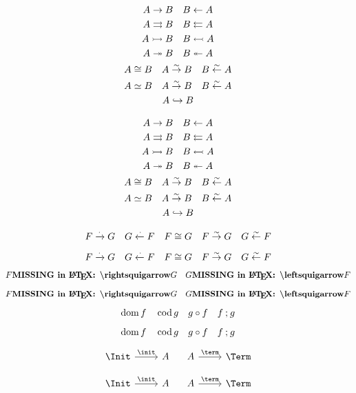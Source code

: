 \documentclass{article}
\begin{document}
\begin{verbatim*}
\begin{gather*}
A\to B\quad
B\from A\\
A\toto B\quad
B\fromfrom A\\
A\monoto B\quad
B\monofrom A\\
A\epito B\quad
B\epifrom A\\
A\iso B\quad
A\isoto B\quad
B\isofrom A\\
A\equ B\quad
A\equivto B\quad
B\equivfrom A\\
A\embeds B
\end{gather*}
\end{verbatim*}
%
\begin{gather*}
  A \to B \quad
  B \leftarrow A \\
  A \rightrightarrows B \quad
  B \leftleftarrows A \\
  A \rightarrowtail B \quad
  B \leftarrowtail A \\
  A \twoheadrightarrow B \quad
  B \twoheadleftarrow A \\
  A \cong B \quad
  A \stackrel{\sim}{\rightarrow} B \quad
  B \stackrel{\sim}{\leftarrow} A \\
  A \simeq B \quad
  A \stackrel{\sim}{\rightarrow} B \quad
  B \stackrel{\sim}{\leftarrow} A \\
  A \hookrightarrow B
\end{gather*}

\begin{verbatim*}
\[
F\natto G\quad
G\natfrom F\quad
F\natiso G\quad
F\natisoto G\quad
G\natisofrom F
\]
\end{verbatim*}
%
\[
  F \xrightarrow{{\cdot}}{} G \quad
  G \xleftarrow{{\cdot}}{} F \quad
  F \cong G \quad
  F \stackrel{\sim}{\rightarrow} G \quad
  G \stackrel{\sim}{\leftarrow} F
\]

\begin{verbatim*}
\[
F\pseudoto G\quad
G\pseudofrom F
\]
\end{verbatim*}
%
\[
  F \text{\bf MISSING in \LaTeX: \textbackslash{}rightsquigarrow} G \quad
  G \text{\bf MISSING in \LaTeX: \textbackslash{}leftsquigarrow} F
\]

\begin{verbatim*}
\[
\dom{f}\quad
\cod{g}\quad
g\after f\quad
f\then g
\]
\end{verbatim*}
%
\[
  \operatorname{dom}{f} \quad
  \operatorname{cod}{g} \quad
  g \circ f \quad
  f \mathbin{;} g
\]

\begin{verbatim*}
\[
\begin{tikzcd}\Init\rar{\init}&A\end{tikzcd}\quad
\begin{tikzcd}A\rar{\term}&\Term\end{tikzcd}
\]
\end{verbatim*}
%
\[
  \begin{tikzcd}\Init \rar{\init} & A\end{tikzcd} \quad
  \begin{tikzcd}A \rar{\term} & \Term\end{tikzcd}
\]
\end{document}
